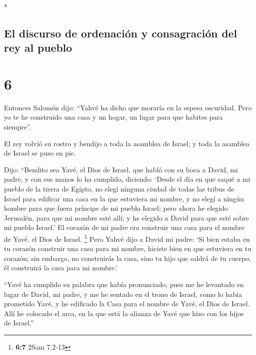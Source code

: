 \begin{paracol}{2}
\begin{otherlanguage}{english}
\end{otherlanguage}

\switchcolumn[0]*

\hypertarget{el-discurso-de-ordenaciuxf3n-y-consagraciuxf3n-del-rey-al-pueblo}{%
\subsection{El discurso de ordenación y consagración del rey al
pueblo}\label{el-discurso-de-ordenaciuxf3n-y-consagraciuxf3n-del-rey-al-pueblo}}

\hypertarget{section-10}{%
\section{6}\label{section-10}}

 Entonces Salomón dijo: ``Yahvé ha dicho que moraría en la
espesa oscuridad.  Pero yo te he construido una casa y un
hogar, un lugar para que habites para siempre''.

 El rey volvió su rostro y bendijo a toda la asamblea de
Israel; y toda la asamblea de Israel se puso en pie.

 Dijo: ``Bendito sea Yavé, el Dios de Israel, que habló
con su boca a David, mi padre, y con sus manos lo ha cumplido, diciendo:
 `Desde el día en que saqué a mi pueblo de la tierra de
Egipto, no elegí ninguna ciudad de todas las tribus de Israel para
edificar una casa en la que estuviera mi nombre, y no elegí a ningún
hombre para que fuera príncipe de mi pueblo Israel;  pero
ahora he elegido Jerusalén, para que mi nombre esté allí; y he elegido a
David para que esté sobre mi pueblo Israel.'  El corazón
de mi padre era construir una casa para el nombre de Yavé, el Dios de
Israel. \footnote{\textbf{6:7} 2Sam 7,2-13}  Pero Yahvé
dijo a David mi padre: `Si bien estaba en tu corazón construir una casa
para mi nombre, hiciste bien en que estuviera en tu corazón;
 sin embargo, no construirás la casa, sino tu hijo que
saldrá de tu cuerpo, él construirá la casa para mi nombre.'

 ``Yavé ha cumplido su palabra que había pronunciado,
pues me he levantado en lugar de David, mi padre, y me he sentado en el
trono de Israel, como lo había prometido Yavé, y he edificado la Casa
para el nombre de Yavé, el Dios de Israel.  Allí he
colocado el arca, en la que está la alianza de Yavé que hizo con los
hijos de Israel.''


\end{paracol}
